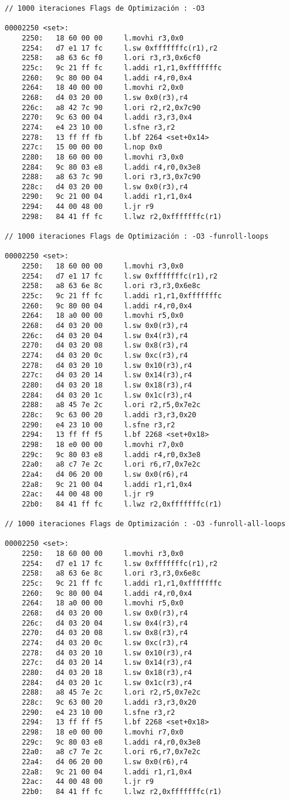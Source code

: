 	\begin{lstlisting}[frame=single]
// 1000 iteraciones Flags de Optimización : -O3

00002250 <set>:
    2250:	18 60 00 00 	l.movhi r3,0x0
    2254:	d7 e1 17 fc 	l.sw 0xfffffffc(r1),r2
    2258:	a8 63 6c f0 	l.ori r3,r3,0x6cf0
    225c:	9c 21 ff fc 	l.addi r1,r1,0xfffffffc
    2260:	9c 80 00 04 	l.addi r4,r0,0x4
    2264:	18 40 00 00 	l.movhi r2,0x0
    2268:	d4 03 20 00 	l.sw 0x0(r3),r4
    226c:	a8 42 7c 90 	l.ori r2,r2,0x7c90
    2270:	9c 63 00 04 	l.addi r3,r3,0x4
    2274:	e4 23 10 00 	l.sfne r3,r2
    2278:	13 ff ff fb 	l.bf 2264 <set+0x14>
    227c:	15 00 00 00 	l.nop 0x0
    2280:	18 60 00 00 	l.movhi r3,0x0
    2284:	9c 80 03 e8 	l.addi r4,r0,0x3e8
    2288:	a8 63 7c 90 	l.ori r3,r3,0x7c90
    228c:	d4 03 20 00 	l.sw 0x0(r3),r4
    2290:	9c 21 00 04 	l.addi r1,r1,0x4
    2294:	44 00 48 00 	l.jr r9
    2298:	84 41 ff fc 	l.lwz r2,0xfffffffc(r1)

// 1000 iteraciones Flags de Optimización : -O3 -funroll-loops

00002250 <set>:
    2250:	18 60 00 00 	l.movhi r3,0x0
    2254:	d7 e1 17 fc 	l.sw 0xfffffffc(r1),r2
    2258:	a8 63 6e 8c 	l.ori r3,r3,0x6e8c
    225c:	9c 21 ff fc 	l.addi r1,r1,0xfffffffc
    2260:	9c 80 00 04 	l.addi r4,r0,0x4
    2264:	18 a0 00 00 	l.movhi r5,0x0
    2268:	d4 03 20 00 	l.sw 0x0(r3),r4
    226c:	d4 03 20 04 	l.sw 0x4(r3),r4
    2270:	d4 03 20 08 	l.sw 0x8(r3),r4
    2274:	d4 03 20 0c 	l.sw 0xc(r3),r4
    2278:	d4 03 20 10 	l.sw 0x10(r3),r4
    227c:	d4 03 20 14 	l.sw 0x14(r3),r4
    2280:	d4 03 20 18 	l.sw 0x18(r3),r4
    2284:	d4 03 20 1c 	l.sw 0x1c(r3),r4
    2288:	a8 45 7e 2c 	l.ori r2,r5,0x7e2c
    228c:	9c 63 00 20 	l.addi r3,r3,0x20
    2290:	e4 23 10 00 	l.sfne r3,r2
    2294:	13 ff ff f5 	l.bf 2268 <set+0x18>
    2298:	18 e0 00 00 	l.movhi r7,0x0
    229c:	9c 80 03 e8 	l.addi r4,r0,0x3e8
    22a0:	a8 c7 7e 2c 	l.ori r6,r7,0x7e2c
    22a4:	d4 06 20 00 	l.sw 0x0(r6),r4
    22a8:	9c 21 00 04 	l.addi r1,r1,0x4
    22ac:	44 00 48 00 	l.jr r9
    22b0:	84 41 ff fc 	l.lwz r2,0xfffffffc(r1)

// 1000 iteraciones Flags de Optimización : -O3 -funroll-all-loops

00002250 <set>:
    2250:	18 60 00 00 	l.movhi r3,0x0
    2254:	d7 e1 17 fc 	l.sw 0xfffffffc(r1),r2
    2258:	a8 63 6e 8c 	l.ori r3,r3,0x6e8c
    225c:	9c 21 ff fc 	l.addi r1,r1,0xfffffffc
    2260:	9c 80 00 04 	l.addi r4,r0,0x4
    2264:	18 a0 00 00 	l.movhi r5,0x0
    2268:	d4 03 20 00 	l.sw 0x0(r3),r4
    226c:	d4 03 20 04 	l.sw 0x4(r3),r4
    2270:	d4 03 20 08 	l.sw 0x8(r3),r4
    2274:	d4 03 20 0c 	l.sw 0xc(r3),r4
    2278:	d4 03 20 10 	l.sw 0x10(r3),r4
    227c:	d4 03 20 14 	l.sw 0x14(r3),r4
    2280:	d4 03 20 18 	l.sw 0x18(r3),r4
    2284:	d4 03 20 1c 	l.sw 0x1c(r3),r4
    2288:	a8 45 7e 2c 	l.ori r2,r5,0x7e2c
    228c:	9c 63 00 20 	l.addi r3,r3,0x20
    2290:	e4 23 10 00 	l.sfne r3,r2
    2294:	13 ff ff f5 	l.bf 2268 <set+0x18>
    2298:	18 e0 00 00 	l.movhi r7,0x0
    229c:	9c 80 03 e8 	l.addi r4,r0,0x3e8
    22a0:	a8 c7 7e 2c 	l.ori r6,r7,0x7e2c
    22a4:	d4 06 20 00 	l.sw 0x0(r6),r4
    22a8:	9c 21 00 04 	l.addi r1,r1,0x4
    22ac:	44 00 48 00 	l.jr r9
    22b0:	84 41 ff fc 	l.lwz r2,0xfffffffc(r1)
	\end{lstlisting}		

